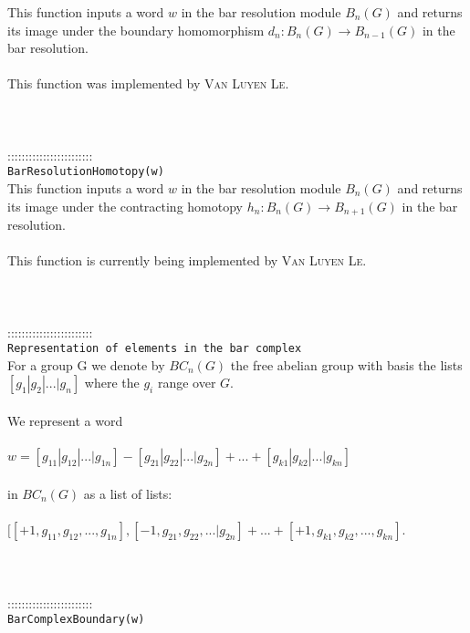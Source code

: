 \documentclass[a4paper,11pt]{report}
\begin{document}
{ This function inputs a word $w$ in the bar resolution module $B_n(G)$ and returns its image under the boundary homomorphism $d_n\colon B_n(G) \rightarrow B_{n-1}(G)$ in the bar resolution. \\
 \\
 This function was implemented by \textsc{Van Luyen Le}. \\
 \\
 \\
 \\
 ::::::::::::::::::::::::\\
 \texttt{BarResolutionHomotopy(w)}\\
 

 This function inputs a word $w$ in the bar resolution module $B_n(G)$ and returns its image under the contracting homotopy $h_n\colon B_n(G) \rightarrow B_{n+1}(G)$ in the bar resolution. \\
 \\
 This function is currently being implemented by \textsc{Van Luyen Le}. \\
 \\
 \\
 \\
 ::::::::::::::::::::::::\\
 \texttt{Representation of elements in the bar complex}\\
 

 For a group G we denote by $BC_n(G)$ the free abelian group with basis the lists $[g_1 | g_2 | ... | g_n]$ where the $g_i$ range over $G$. \\
 \\
 We represent a word \\
 \\
 $w = [g_{11} | g_{12} | ... | g_{1n}] - [g_{21} | g_{22} | ... | g_{2n}] + ...
+ [g_{k1} | g_{k2} | ... | g_{kn}] $ \\
 \\
 in $BC_n(G)$ as a list of lists: \\
 \\
 $ [ [+1,g_{11} , g_{12} , ... , g_{1n}] , [-1, g_{21} , g_{22} , ... | g_{2n}] +
... + [+1, g_{k1} , g_{k2} , ... , g_{kn}] $. \\
 \\
 \\
 \\
 ::::::::::::::::::::::::\\
 \texttt{BarComplexBoundary(w)}\\
 

}
\end{document}
